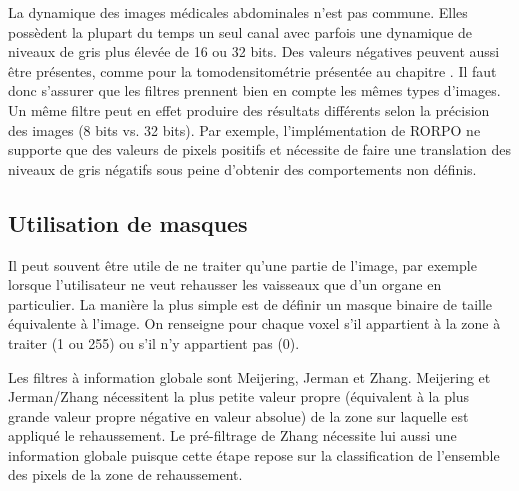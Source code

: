 La dynamique des images médicales abdominales n'est pas commune. Elles possèdent la plupart du temps un seul canal avec parfois une dynamique de niveaux de gris plus élevée de 16 ou 32 bits. Des valeurs négatives peuvent aussi être présentes, comme pour la tomodensitométrie présentée au chapitre \chapContextN. Il faut donc s'assurer que les filtres prennent bien en compte les mêmes types d’images. Un même filtre peut en effet produire des résultats différents selon la précision des images (8 bits vs. 32 bits). Par exemple, l'implémentation de RORPO ne supporte que des valeurs de pixels positifs et nécessite de faire une translation des niveaux de gris négatifs sous peine d'obtenir des comportements non définis.

\subsection{Utilisation de masques}

Il peut souvent être utile de ne traiter qu'une partie de l'image, par exemple lorsque l'utilisateur ne veut rehausser les vaisseaux que d'un organe en particulier. La manière la plus simple est de définir un masque binaire de taille équivalente à l'image. On renseigne pour chaque voxel s'il appartient à la zone à traiter (1 ou 255) ou s'il n'y appartient pas (0). 



Les filtres à information globale sont Meijering, Jerman et Zhang. Meijering et Jerman/Zhang nécessitent la plus petite valeur propre (équivalent à la plus grande valeur propre négative en valeur absolue) de la zone sur laquelle est appliqué le rehaussement. Le pré-filtrage de Zhang nécessite lui aussi une information globale puisque cette étape repose sur la classification de l'ensemble des pixels de la zone de rehaussement.

